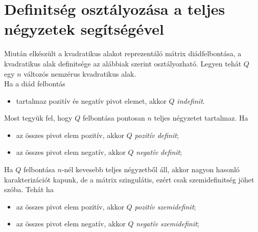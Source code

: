 \documentclass[9pt, a4paper, showtrims]{memoir}
\theoremstyle{plain}
\theoremstyle{remark}
\theoremstyle{definition}
\begin{document}
\section{Definitség osztályozása a teljes négyzetek segítségével}
Miután elkészült a kvadratikus alakot reprezentáló mátrix diádfelbontása,
a kvadratikus alak definitsége az alábbiak szerint osztályozható.
Legyen tehát $Q$ egy $n$ változós nemzérus kvadratikus alak.\\
Ha a diád felbontás
\begin{itemize}
    \item tartalmaz pozitív és negatív pivot elemet, 
        akkor $Q$ \emph{indefinit}.
\end{itemize}
Most tegyük fel, hogy $Q$ felbontása pontosan $n$ teljes négyzetet tartalmaz.
Ha
\begin{itemize}
    \item az összes pivot elem pozitív,
        akkor $Q$ \emph{pozitív definit};
    \item az összes pivot elem negatív,
        akkor $Q$ \emph{negatív definit};
\end{itemize}
Ha $Q$ felbontása $n$-nél kevesebb teljes négyzetből áll,
akkor nagyon hasonló karakterizációt kapunk, de a mátrix szingulátis, ezért csak szemidefinitség jöhet szóba.
Tehát ha
\begin{itemize}
\item az összes pivot elem pozitív,
    akkor $Q$ \emph{pozitív szemidefinit};
\item az összes pivot elem negatív,
    akkor $Q$ \emph{negatív szemidefinit};
\end{itemize}

\backmatter
\pagestyle{empty}
%
\printbibliography
\printindex
\end{document}
